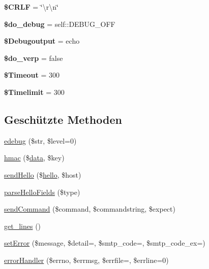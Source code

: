 \begin{DoxyCompactItemize}
{\bfseries \$\+C\+R\+LF} = \char`\"{}\textbackslash{}r\textbackslash{}n\char`\"{}
\item 
\mbox{\label{class_s_m_t_p_aecf5a15107efffb004210746eb3e58bf}} 
{\bfseries \$do\+\_\+debug} = self\+::\+D\+E\+B\+U\+G\+\_\+\+O\+FF
\item 
\mbox{\label{class_s_m_t_p_a0ce9e88c86073a74f12385375129caf9}} 
{\bfseries \$\+Debugoutput} = \textquotesingle{}echo\textquotesingle{}
\item 
\mbox{\label{class_s_m_t_p_ac682fd7712ecbd5f11917c99d173de43}} 
{\bfseries \$do\+\_\+verp} = false
\item 
\mbox{\label{class_s_m_t_p_ab06eec525b731db7d69082f974239ecc}} 
{\bfseries \$\+Timeout} = 300
\item 
\mbox{\label{class_s_m_t_p_a8ba184f9b746339c2281a90e6af61e5b}} 
{\bfseries \$\+Timelimit} = 300
\end{DoxyCompactItemize}
\subsection*{Geschützte Methoden}
\begin{DoxyCompactItemize}
\item 
\mbox{\hyperlink{class_s_m_t_p_a9651e3051d912d24b722199a51245f0d}{edebug}} (\$str, \$level=0)
\item 
\mbox{\hyperlink{class_s_m_t_p_a657747e7a6bb2f2bb35e7e637ffe5877}{hmac}} (\$\mbox{\hyperlink{class_s_m_t_p_ae5ae69f15530c34b0d40db955a83679c}{data}}, \$key)
\item 
\mbox{\hyperlink{class_s_m_t_p_af08470e72404fac3c15daecb270b7a75}{send\+Hello}} (\$\mbox{\hyperlink{class_s_m_t_p_af1bb1a12327aa53955758265a10f5d05}{hello}}, \$host)
\item 
\mbox{\hyperlink{class_s_m_t_p_ab2b2c38a7d482ba6693aefd9c436fc94}{parse\+Hello\+Fields}} (\$type)
\item 
\mbox{\hyperlink{class_s_m_t_p_a87e84c6756c5dcf01c9d8c6c185786a1}{send\+Command}} (\$command, \$commandstring, \$expect)
\item 
\mbox{\hyperlink{class_s_m_t_p_aac2979bf3894af90e6b228c418358f54}{get\+\_\+lines}} ()
\item 
\mbox{\hyperlink{class_s_m_t_p_a1c7ce9a21d7e4fd5281b7115d81dd0d2}{set\+Error}} (\$message, \$detail=\textquotesingle{}\textquotesingle{}, \$smtp\+\_\+code=\textquotesingle{}\textquotesingle{}, \$smtp\+\_\+code\+\_\+ex=\textquotesingle{}\textquotesingle{})
\item 
\mbox{\hyperlink{class_s_m_t_p_ac725d705609a6d6f589bb4f35f9647d6}{error\+Handler}} (\$errno, \$errmsg, \$errfile=\textquotesingle{}\textquotesingle{}, \$errline=0)
\end{DoxyCompactItemize}
